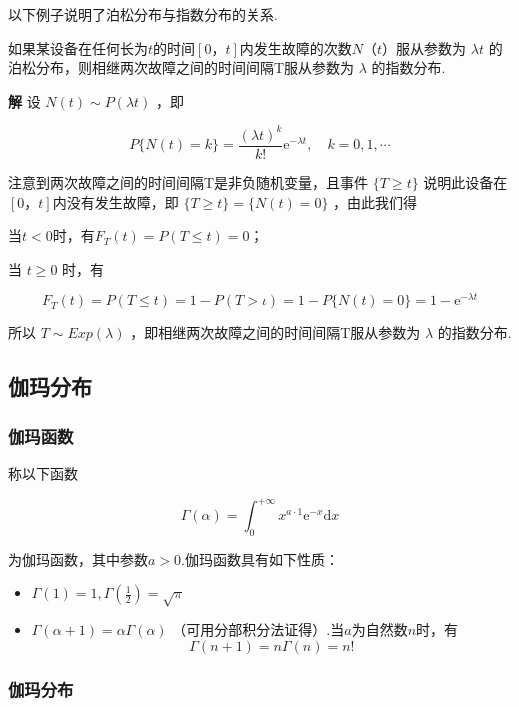 以下例子说明了泊松分布与指数分布的关系.

\begin{example}
	如果某设备在任何长为$ t $的时间$ [0，t] $内发生故障的次数$ N（t） $服从参数为 $\lambda t$ 的泊松分布，则相继两次故障之间的时间间隔T服从参数为 $\lambda$ 的指数分布.
	
	\textbf{解} 设 $N(t) \sim P(\lambda t)$ ，即
	
	\[
	P\{N(t)=k\}=\frac{(\lambda t)^{k}}{k !} \mathrm{e}^{-\lambda t}, \quad k=0,1, \cdots
	\]
	
	注意到两次故障之间的时间间隔T是非负随机变量，且事件 $\{T \geqslant t\}$ 说明此设备在$ [0，t] $内没有发生故障，即 $\{T \geqslant t\}=\{N(t)=0\}$ ，由此我们得
	
	当$ t<0 $时，有$F_{T}(t)=P(T \leqslant t)=0$；
	
	当 $t \geqslant 0$ 时，有
	
	\[
	F_{T}(t)=P(T \leqslant t)=1-P(T>\iota)=1-P\{N(t)=0\}=1-\mathrm{e}^{-\lambda t}
	\]
	
	所以 $T \sim E x p(\lambda)$ ，即相继两次故障之间的时间间隔T服从参数为 $\lambda$ 的指数分布.
\end{example}

\subsection{伽玛分布}

\subsubsection{伽玛函数}

称以下函数

\begin{equation}
\Gamma(\alpha)=\int_{0}^{+\infty} x^{a \cdot 1} \mathrm{e}^{-x} \mathrm{d} x \label{eq:2.5.11}
\end{equation}

为伽玛函数，其中参数$ a>0 $.伽玛函数具有如下性质：

\begin{itemize}
	\item $\Gamma(1)=1, \Gamma\left(\frac{1}{2}\right)=\sqrt{\pi}$
	\item $\Gamma(\alpha+1)=\alpha \Gamma(\alpha)$ （可用分部积分法证得）.当$ a $为自然数$ n $时，有
	\[
	\Gamma(n+1)=n \Gamma(n)=n !
	\]
\end{itemize}

\subsubsection{伽玛分布}

